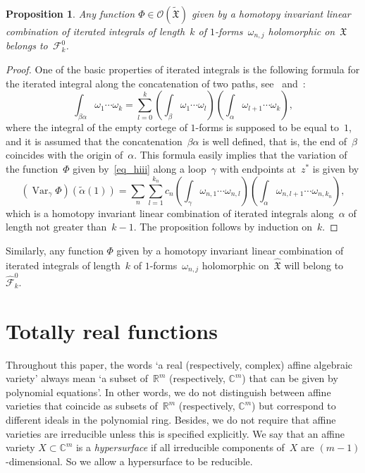 \documentclass[reqno,tbtags,12pt]{amsart}
\numberwithin{equation}{section}
\newcommand{\R}{\mathbb{R}}
\newcommand{\C}{\mathbb{C}}
\newcommand{\FX}{\mathfrak{X}}
\newcommand{\tFX}{\widetilde{\mathfrak{X}}}
\newcommand{\hFX}{\widehat{\mathfrak{X}}}
\newcommand{\CF}{\mathcal{F}}
\newcommand{\hCF}{\widehat{\mathcal{F}}}
\newcommand{\CO}{\mathcal{O}}
\newcommand{\talpha}{\widetilde{\alpha}}
\newcommand{\Var}{\mathop{\mathrm{Var}}\nolimits}
\newtheorem{propos}[theorem]{Proposition}
\theoremstyle{definition}
\begin{document}
\begin{propos}\label{propos_iterate}
Any function $\Phi\in\CO(\tFX)$ given by a homotopy invariant linear combination of iterated integrals of length~$k$ of\/ $1$-forms~$\omega_{n,j}$ holomorphic on~$\FX$ belongs to~$\CF^0_k$.
\end{propos}
\begin{proof}
One of the basic properties of iterated integrals is the following formula for the iterated integral along the concatenation of two paths, see~\cite[Prop.~2]{Par66} and~\cite[Prop.~1.5.1]{Che73}:
$$
\int_{\beta\alpha}\omega_1\cdots\omega_k=\sum_{l=0}^k\left(\int_{\beta}\omega_1\cdots\omega_l\right)\left(\int_{\alpha}\omega_{l+1}\cdots\omega_k\right),
$$
where the integral of the empty cortege  of $1$-forms is supposed to be equal to~$1$, and it is assumed that the concatenation~$\beta\alpha$ is well defined, that is, the end of~$\beta$ coincides with the origin of~$\alpha$. This formula easily implies that the variation of the function~$\Phi$ given by~\eqref{eq_hiii} along a loop~$\gamma$ with endpoints at~$z^*$ is given by
\begin{equation*}
(\Var_{\gamma}\Phi)(\talpha(1))=\sum_{n}\sum_{l=1}^{k_n}c_n\left(\int_{\gamma}\omega_{n,1}\cdots\omega_{n,l}\right)\left(\int_{\alpha}\omega_{n,l+1}\cdots\omega_{n,k_n}\right),
\end{equation*}
which is a homotopy invariant linear combination of iterated integrals along~$\alpha$ of length not greater than~$k-1$. The proposition follows by induction on~$k$.
\end{proof}

Similarly, any function $\Phi$ given by a homotopy invariant linear combination of iterated integrals of length~$k$ of\/ $1$-forms~$\omega_{n,j}$ holomorphic on~$\hFX$ will belong to~$\hCF^0_k$.



\section{Totally real functions}\label{section_tot_real}


Throughout this paper, the words `a real (respectively, complex) affine algebraic variety' always mean `a subset of~$\R^m$ (respectively, $\C^m$) that can be given by polynomial equations'. In other words, we do not distinguish between affine varieties that coincide as subsets of~$\R^m$ (respectively, $\C^m$) but correspond to different ideals in the polynomial ring. Besides, we do not require that affine varieties  are irreducible unless this is specified explicitly. We say that an affine variety $X\subset\C^m$ is a \textit{hypersurface\/} if all irreducible components of~$X$ are $(m-1)$-dimensional. So we allow a hypersurface to be  reducible. 
\end{document}
